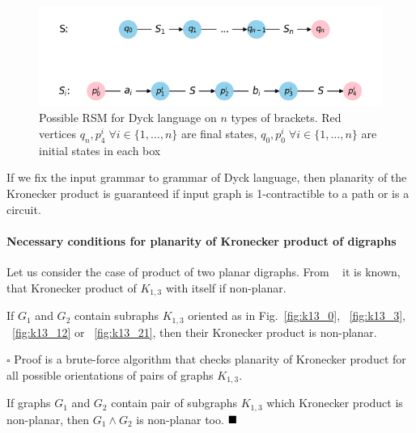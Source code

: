\begin{figure}[h]

  \begin{center}  
  \includegraphics[scale = 0.4]{dyck_n.png}
  \end{center}

  \caption{Possible RSM for Dyck language on $n$ types of brackets. Red vertices $q_n, p^i_4 \; \forall i \in \{1, \ldots, n\}$  are final states, $q_0, p^i_0 \; \forall i \in \{1, \ldots, n\}$ are initial states in each box}

  \label{fig:dyck_n}

\end{figure}

\begin{corollary}
If we fix the input grammar to grammar of Dyck language, then planarity of the Kronecker product is guaranteed if input graph is 1-contractible to a path or is a circuit.
\end{corollary}

\paragraph{Necessary conditions for planarity of Kronecker product of digraphs}

Let us consider the case of product of two planar digraphs. From ~\citep{farzan1977kronecker} it is known, that Kronecker product of $K_{1, 3}$ with itself if non-planar.

\begin{proposition}
If $G_1$ and $G_2$ contain subraphs $K_{1, 3}$ oriented as in Fig.~\ref{fig:k13_0}, ~\ref{fig:k13_3}, ~\ref{fig:k13_12} or ~\ref{fig:k13_21}, then their Kronecker product is non-planar. 
\end{proposition}

$\square$
Proof is a brute-force algorithm that checks planarity of Kronecker product for all possible orientations of pairs of graphs $K_{1, 3}$.

If graphs $G_1$ and $G_2$ contain pair of subgraphs $K_{1, 3}$ which Kronecker product is non-planar, then $G_1 \wedge G_2$ is non-planar too.
$\hfill\blacksquare$

